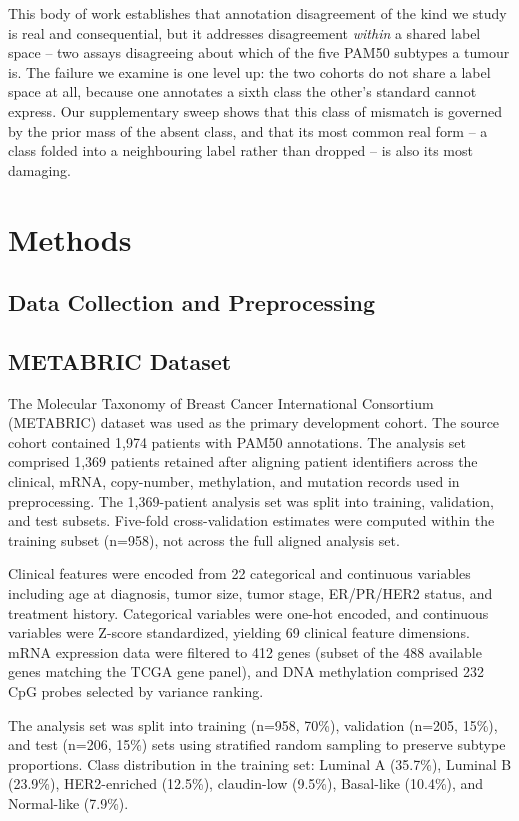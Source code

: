 \documentclass[10pt,journal,compsoc,twocolumn]{IEEEtran}
\begin{document}
This body of work establishes that annotation disagreement of the kind we study is real and consequential, but it addresses disagreement \emph{within} a shared label space -- two assays disagreeing about which of the five PAM50 subtypes a tumour is. The failure we examine is one level up: the two cohorts do not share a label space at all, because one annotates a sixth class the other's standard cannot express. Our supplementary sweep shows that this class of mismatch is governed by the prior mass of the absent class, and that its most common real form -- a class folded into a neighbouring label rather than dropped -- is also its most damaging.

\section{Methods}

\subsection{Data Collection and Preprocessing}

\subsection{METABRIC Dataset}
The Molecular Taxonomy of Breast Cancer International Consortium (METABRIC) dataset \cite{curtis2012genomic} was used as the primary development cohort. The source cohort contained 1,974 patients with PAM50 annotations. The analysis set comprised 1,369 patients retained after aligning patient identifiers across the clinical, mRNA, copy-number, methylation, and mutation records used in preprocessing. The 1,369-patient analysis set was split into training, validation, and test subsets. Five-fold cross-validation estimates were computed within the training subset (n=958), not across the full aligned analysis set.

Clinical features were encoded from 22 categorical and continuous variables including age at diagnosis, tumor size, tumor stage, ER/PR/HER2 status, and treatment history. Categorical variables were one-hot encoded, and continuous variables were Z-score standardized, yielding 69 clinical feature dimensions. mRNA expression data were filtered to 412 genes (subset of the 488 available genes matching the TCGA gene panel), and DNA methylation comprised 232 CpG probes selected by variance ranking.

The analysis set was split into training (n=958, 70\%), validation (n=205, 15\%), and test (n=206, 15\%) sets using stratified random sampling to preserve subtype proportions. Class distribution in the training set: Luminal A (35.7\%), Luminal B (23.9\%), HER2-enriched (12.5\%), claudin-low (9.5\%), Basal-like (10.4\%), and Normal-like (7.9\%).
\end{document}
